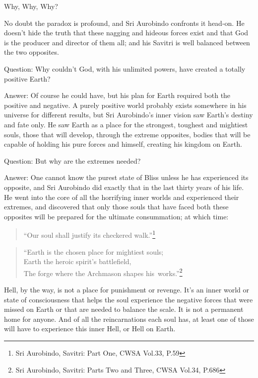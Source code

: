 \documentclass[12pt,a4paper]{book}
\begin{document}
\noindent Why, Why, Why?

No doubt the paradox is profound, and Sri Aurobindo confronts it
head-on. He doesn't hide the truth that these nagging and hideous
forces exist and that God is the producer and director of them all;
and his Savitri is well balanced between the two opposites.

Question: Why couldn't God, with his unlimited powers, have created a
totally positive Earth?

Answer: Of course he could have, but his plan for Earth required both
the positive and negative. A purely positive world probably exists
somewhere in his universe for different results, but Sri Aurobindo's
inner vision saw Earth's destiny and fate only. He saw Earth as a
place for the strongest, toughest and mightiest souls, those that will
develop, through the extreme opposites, bodies that will be capable of
holding his pure forces and himself, creating his kingdom on Earth.

Question: But why are the extremes needed?

Answer: One cannot know the purest state of Bliss unless he has
experienced its opposite, and Sri Aurobindo did exactly that in the
last thirty years of his life. He went into the core of all the
horrifying inner worlds and experienced their extremes, and discovered
that only those souls that have faced both these opposites will be
prepared for the ultimate consummation; at which time:

\begin{verse}
``Our soul shall justify its checkered walk.''\footnote{Sri Aurobindo, Savitri: Part One, CWSA Vol.33, P.59}
\end{verse}

\begin{verse}
``Earth is the chosen place for mightiest souls;\\ Earth the heroic
  spirit's battlefield,\\ The forge where the Archmason shapes his~works.''\footnote{Sri Aurobindo, Savitri: Parts Two and Three, CWSA
    Vol.34, P.686}
\end{verse}

Hell, by the way, is not a place for punishment or revenge. It's an
inner world or state of consciousness that helps the soul experience
the negative forces that were missed on Earth or that are needed to
balance the scale. It is not a permanent home for anyone. And of all
the reincarnations each soul has, at least one of those will have to
experience this inner Hell, or Hell on Earth.
\end{document}
